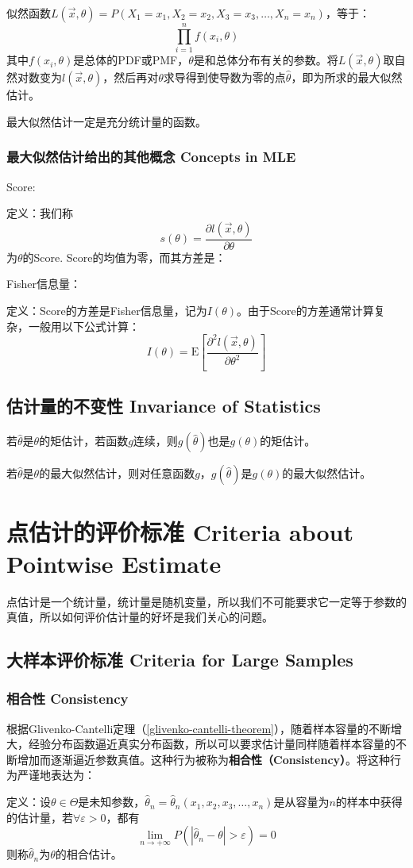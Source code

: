 \documentclass[UTF8]{ctexbook}
\begin{document}
似然函数$L(\vec x,\theta)=P(X_1=x_1,X_2=x_2,X_3=x_3,\dots,X_n=x_n)$，等于：
\[
	\prod_{i=1}^nf(x_i,\theta)
\]
其中$f(x_i,\theta)$是总体的PDF或PMF，$\theta$是和总体分布有关的参数。将$L(\vec x,\theta)$取自然对数变为$l(\vec x,\theta)$，然后再对$\theta$求导得到使导数为零的点$\hat\theta$，即为所求的最大似然估计。

最大似然估计一定是充分统计量的函数。
\subsubsection{最大似然估计给出的其他概念 Concepts in MLE}
Score:

定义：我们称
\[
	s(\theta)=\frac{\partial l(\vec x,\theta)}{\partial\theta}
\]
为$\theta$的Score. Score的均值为零，而其方差是：

Fisher信息量：

定义：Score的方差是Fisher信息量，记为$I(\theta)$。由于Score的方差通常计算复杂，一般用以下公式计算：
\[
	I(\theta)=\mathrm E\left[\frac{\partial^2 l(\vec x,\theta)}{\partial \theta^2}\right]
\]
\subsection{估计量的不变性 Invariance of Statistics}
若$\hat\theta$是$\theta$的矩估计，若函数$g$连续，则$g(\hat\theta)$也是$g(\theta)$的矩估计。

若$\hat\theta$是$\theta$的最大似然估计，则对任意函数$g$，$g(\hat\theta)$是$g(\theta)$的最大似然估计。
\section{点估计的评价标准 Criteria about Pointwise Estimate}
点估计是一个统计量，统计量是随机变量，所以我们不可能要求它一定等于参数的真值，所以如何评价估计量的好坏是我们关心的问题。
\subsection{大样本评价标准 Criteria for Large Samples}
\subsubsection{相合性 Consistency}
根据Glivenko-Cantelli定理（\ref{glivenko-cantelli-theorem}），随着样本容量的不断增大，经验分布函数逼近真实分布函数，所以可以要求估计量同样随着样本容量的不断增加而逐渐逼近参数真值。这种行为被称为\textbf{相合性（Consistency）}。将这种行为严谨地表达为：

定义：设$\theta\in\Theta$是未知参数，$\hat\theta_n=\hat\theta_n(x_1,x_2,x_3,\dots,x_n)$是从容量为$n$的样本中获得的估计量，若$\forall \varepsilon>0$，都有
\[
	\lim_{n\to+\infty}P(|\hat\theta_n-\theta|>\varepsilon)=0
\]
则称$\hat\theta_n$为$\theta$的相合估计。
\end{document}
